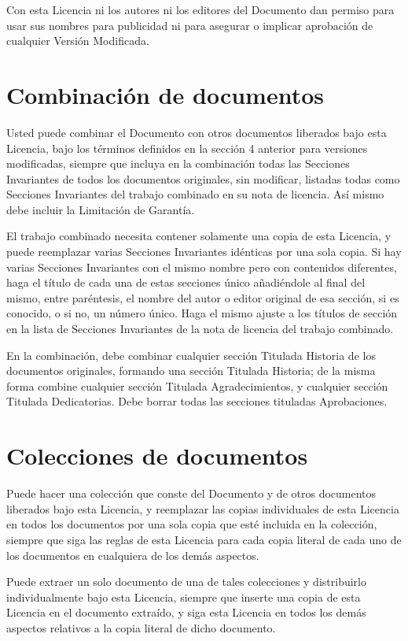 Con esta Licencia ni los autores ni los editores del Documento dan
permiso para usar sus nombres para publicidad ni para asegurar o
implicar aprobación de cualquier Versión Modificada.


\section{Combinación de documentos}

Usted puede combinar el Documento con otros documentos liberados bajo
esta Licencia, bajo los términos definidos en la sección 4 anterior
para versiones modificadas, siempre que incluya en la combinación
todas las Secciones Invariantes de todos los documentos originales,
sin modificar, listadas todas como Secciones Invariantes del trabajo
combinado en su nota de licencia. Así mismo debe incluir la Limitación
de Garantía.

El trabajo combinado necesita contener solamente una copia de esta
Licencia, y puede reemplazar varias Secciones Invariantes idénticas
por una sola copia. Si hay varias Secciones Invariantes con el mismo
nombre pero con contenidos diferentes, haga el título de cada una de
estas secciones único añadiéndole al final del mismo, entre
paréntesis, el nombre del autor o editor original de esa sección, si
es conocido, o si no, un número único. Haga el mismo ajuste a los
títulos de sección en la lista de Secciones Invariantes de la nota de
licencia del trabajo combinado.

En la combinación, debe combinar cualquier sección Titulada Historia
de los documentos originales, formando una sección Titulada Historia;
de la misma forma combine cualquier sección Titulada Agradecimientos,
y cualquier sección Titulada Dedicatorias. Debe borrar todas las
secciones tituladas Aprobaciones.


\section{Colecciones de documentos}

Puede hacer una colección que conste del Documento y de otros
documentos liberados bajo esta Licencia, y reemplazar las copias
individuales de esta Licencia en todos los documentos por una sola
copia que esté incluida en la colección, siempre que siga las reglas
de esta Licencia para cada copia literal de cada uno de los documentos
en cualquiera de los demás aspectos.

Puede extraer un solo documento de una de tales colecciones y
distribuirlo individualmente bajo esta Licencia, siempre que inserte
una copia de esta Licencia en el documento extraído, y siga esta
Licencia en todos los demás aspectos relativos a la copia literal de
dicho documento.


